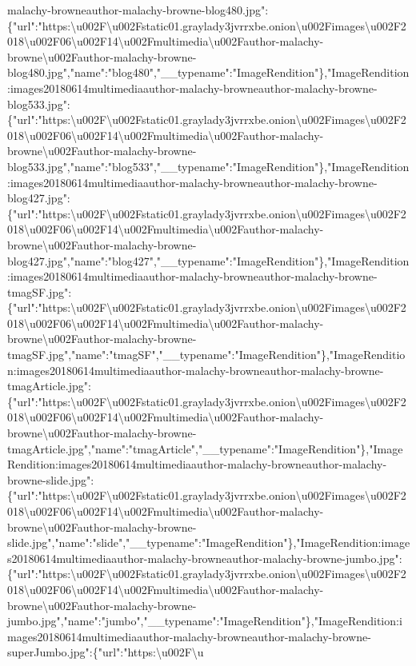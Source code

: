 malachy-browneauthor-malachy-browne-blog480.jpg":\{"url":"https:\textbackslash{}u002F\textbackslash{}u002Fstatic01.graylady3jvrrxbe.onion\textbackslash{}u002Fimages\textbackslash{}u002F2018\textbackslash{}u002F06\textbackslash{}u002F14\textbackslash{}u002Fmultimedia\textbackslash{}u002Fauthor-malachy-browne\textbackslash{}u002Fauthor-malachy-browne-blog480.jpg","name":"blog480","\_\_typename":"ImageRendition"\},"ImageRendition:images20180614multimediaauthor-malachy-browneauthor-malachy-browne-blog533.jpg":\{"url":"https:\textbackslash{}u002F\textbackslash{}u002Fstatic01.graylady3jvrrxbe.onion\textbackslash{}u002Fimages\textbackslash{}u002F2018\textbackslash{}u002F06\textbackslash{}u002F14\textbackslash{}u002Fmultimedia\textbackslash{}u002Fauthor-malachy-browne\textbackslash{}u002Fauthor-malachy-browne-blog533.jpg","name":"blog533","\_\_typename":"ImageRendition"\},"ImageRendition:images20180614multimediaauthor-malachy-browneauthor-malachy-browne-blog427.jpg":\{"url":"https:\textbackslash{}u002F\textbackslash{}u002Fstatic01.graylady3jvrrxbe.onion\textbackslash{}u002Fimages\textbackslash{}u002F2018\textbackslash{}u002F06\textbackslash{}u002F14\textbackslash{}u002Fmultimedia\textbackslash{}u002Fauthor-malachy-browne\textbackslash{}u002Fauthor-malachy-browne-blog427.jpg","name":"blog427","\_\_typename":"ImageRendition"\},"ImageRendition:images20180614multimediaauthor-malachy-browneauthor-malachy-browne-tmagSF.jpg":\{"url":"https:\textbackslash{}u002F\textbackslash{}u002Fstatic01.graylady3jvrrxbe.onion\textbackslash{}u002Fimages\textbackslash{}u002F2018\textbackslash{}u002F06\textbackslash{}u002F14\textbackslash{}u002Fmultimedia\textbackslash{}u002Fauthor-malachy-browne\textbackslash{}u002Fauthor-malachy-browne-tmagSF.jpg","name":"tmagSF","\_\_typename":"ImageRendition"\},"ImageRendition:images20180614multimediaauthor-malachy-browneauthor-malachy-browne-tmagArticle.jpg":\{"url":"https:\textbackslash{}u002F\textbackslash{}u002Fstatic01.graylady3jvrrxbe.onion\textbackslash{}u002Fimages\textbackslash{}u002F2018\textbackslash{}u002F06\textbackslash{}u002F14\textbackslash{}u002Fmultimedia\textbackslash{}u002Fauthor-malachy-browne\textbackslash{}u002Fauthor-malachy-browne-tmagArticle.jpg","name":"tmagArticle","\_\_typename":"ImageRendition"\},"ImageRendition:images20180614multimediaauthor-malachy-browneauthor-malachy-browne-slide.jpg":\{"url":"https:\textbackslash{}u002F\textbackslash{}u002Fstatic01.graylady3jvrrxbe.onion\textbackslash{}u002Fimages\textbackslash{}u002F2018\textbackslash{}u002F06\textbackslash{}u002F14\textbackslash{}u002Fmultimedia\textbackslash{}u002Fauthor-malachy-browne\textbackslash{}u002Fauthor-malachy-browne-slide.jpg","name":"slide","\_\_typename":"ImageRendition"\},"ImageRendition:images20180614multimediaauthor-malachy-browneauthor-malachy-browne-jumbo.jpg":\{"url":"https:\textbackslash{}u002F\textbackslash{}u002Fstatic01.graylady3jvrrxbe.onion\textbackslash{}u002Fimages\textbackslash{}u002F2018\textbackslash{}u002F06\textbackslash{}u002F14\textbackslash{}u002Fmultimedia\textbackslash{}u002Fauthor-malachy-browne\textbackslash{}u002Fauthor-malachy-browne-jumbo.jpg","name":"jumbo","\_\_typename":"ImageRendition"\},"ImageRendition:images20180614multimediaauthor-malachy-browneauthor-malachy-browne-superJumbo.jpg":\{"url":"https:\textbackslash{}u002F\textbackslash{}u